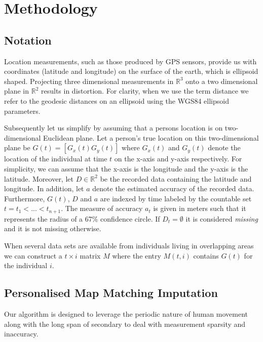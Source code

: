 \documentclass[man]{apa6}
\theoremstyle{definition}
\theoremstyle{definition}
\theoremstyle{definition}
\theoremstyle{remark}
\begin{document}
\section{Methodology}\label{methodology}

\subsection{Notation}\label{notation}

Location measurements, such as those produced by GPS sensors, provide us
with coordinates (latitude and longitude) on the surface of the earth,
which is ellipsoid shaped. Projecting three dimensional measurements in
\(\mathbb{R}^3\) onto a two dimensional plane in \(\mathbb{R}^2\)
results in distortion. For clarity, when we use the term distance we
refer to the geodesic distances on an ellipsoid using the WGS84
ellipsoid parameters.

Subsequently let us simplify by assuming that a persons location is on
two-dimensional Euclidean plane. Let a person's true location on this
two-dimensional plane be \(G(t) = [G_x(t) G_y(t)]\) where \(G_x(t)\) and
\(G_y(t)\) denote the location of the individual at time \(t\) on the
x-axis and y-axis respectively. For simplicity, we can assume that the
x-axis is the longitude and the y-axis is the latitude. Moreover, let
\(D \in \mathbb{R}^2\) be the recorded data containing the latitude and
longitude. In addition, let \(a\) denote the estimated accuracy of the
recorded data. Furthermore, \(G(t)\), \(D\) and \(a\) are indexed by
time labeled by the countable set \(t = t_1 < ... < t_{n+1}\). The
measure of accuracy \(a_t\) is given in meters such that it represents
the radius of a 67\% confidence circle. If \(D_t = \emptyset\) it is
considered \emph{missing} and it is not missing otherwise.

When several data sets are available from individuals living in
overlapping areas we can construct a \(t \times i\) matrix \(M\) where
the entry \(M(t,i)\) contains \(G(t)\) for the individual \(i\).

\subsection{Personalised Map Matching
Imputation}\label{personalised-map-matching-imputation}

Our algorithm is designed to leverage the periodic nature of human
movement along with the long span of secondary to deal with measurement
sparsity and inaccuracy.
\end{document}
